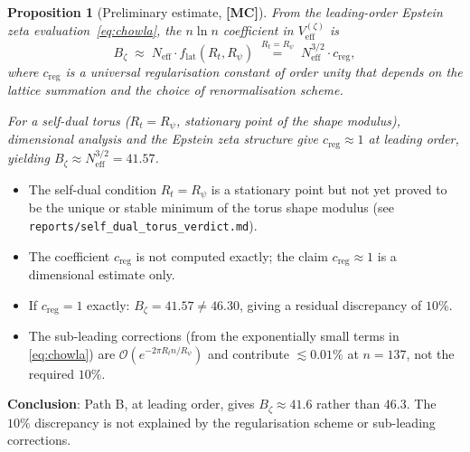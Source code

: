 \documentclass[12pt,a4paper]{article}
\newtheorem{proposition}[theorem]{Proposition}
\theoremstyle{definition}
\theoremstyle{remark}
\newcommand{\MC}{\textbf{[MC]}}
\newcommand{\calO}{\mathcal{O}}
\begin{document}
\begin{proposition}[Preliminary estimate, \MC]
\label{prop:B_base}
From the leading-order Epstein zeta evaluation~\eqref{eq:chowla},
the $n\ln n$ coefficient in $V_{\mathrm{eff}}^{(\zeta)}$ is
\begin{equation}
\label{eq:B_estimate}
  B_{\zeta}
  \;\approx\;
  N_{\mathrm{eff}} \cdot f_{\mathrm{lat}}(R_t, R_\psi)
  \;\stackrel{R_t = R_\psi}{=}\;
  N_{\mathrm{eff}}^{3/2} \cdot c_{\mathrm{reg}},
\end{equation}
where $c_{\mathrm{reg}}$ is a universal regularisation constant of order unity
that depends on the lattice summation and the choice of renormalisation scheme.

For a self-dual torus ($R_t = R_\psi$, stationary point of the shape modulus),
dimensional analysis and the Epstein zeta structure give
$c_{\mathrm{reg}} \approx 1$ at leading order, yielding
$B_{\zeta} \approx N_{\mathrm{eff}}^{3/2} = 41.57$.
\end{proposition}

\begin{tcolorbox}[colback=red!4!white,colframe=red!55!black,
  title={Limitations of Proposition~\ref{prop:B_base}}]
\begin{itemize}
  \item The self-dual condition $R_t = R_\psi$ is a stationary point but not
        yet proved to be the unique or stable minimum of the torus shape
        modulus (see \texttt{reports/self\_dual\_torus\_verdict.md}).
  \item The coefficient $c_{\mathrm{reg}}$ is not computed exactly; the
        claim $c_{\mathrm{reg}} \approx 1$ is a dimensional estimate only.
  \item If $c_{\mathrm{reg}} = 1$ exactly: $B_\zeta = 41.57 \neq 46.30$,
        giving a residual discrepancy of $10\%$.
  \item The sub-leading corrections (from the exponentially small terms in
        \eqref{eq:chowla}) are $\calO(e^{-2\pi R_t n/R_\psi})$ and contribute
        $\lesssim 0.01\%$ at $n = 137$, not the required $10\%$.
\end{itemize}

\textbf{Conclusion}: Path B, at leading order, gives $B_\zeta \approx 41.6$
rather than $46.3$.  The $10\%$ discrepancy is not explained by the
regularisation scheme or sub-leading corrections.
\end{tcolorbox}

\end{document}
